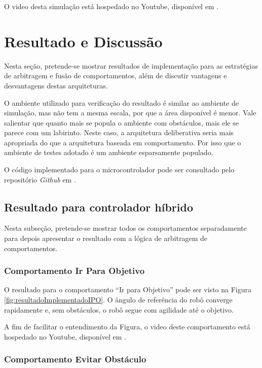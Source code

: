 	
	
	O video desta simulação está hospedado no Youtube, disponível em 
	.
	
\section{Resultado e Discussão}

	Nesta seção, pretende-se mostrar resultados de implementação para as estratégias de 
	arbitragem e fusão de comportamentos, além de discutir vantagens e desvantagens destas 
	arquiteturas.
	
	O ambiente utilizado para verificação do resultado é similar ao ambiente de simulação, mas não tem a mesma
	escala, por que a área disponível é menor. Vale salientar que quanto mais se popula o ambiente com obstáculos,
	mais ele se parece com um labirinto. Neste caso, a arquitetura deliberativa seria mais apropriada do que a 
	arquitetura baseada em comportamento. Por isso que o ambiente de testes adotado é um ambiente esparsamente 
	populado.
	
	O código implementado para o microcontrolador pode ser consultado pelo repositório 
	\textit{Github} em .
	 
	\subsection{Resultado para controlador híbrido}
	
	Nesta subseção, pretende-se mostrar todos os comportamentos separadamente para 
	depois apresentar o resultado com a lógica de arbitragem de comportamentos.
	
	\subsubsection{Comportamento Ir Para Objetivo}
	
	O resultado para o comportamento ``Ir para Objetivo'' pode ser visto na Figura
	\ref{fig:resultadoImplementadoIPO}. O ângulo de referência do robô converge rapidamente
	e, sem obstáculos, o robô segue com agilidade até o objetivo.
	
	
	
	A fim de facilitar o entendimento da Figura, o video deste comportamento está 
	hospedado no Youtube, disponível em .
	
	\subsubsection{Comportamento Evitar Obstáculo}
	

